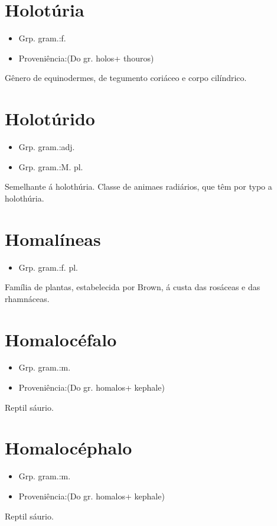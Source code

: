 \documentclass{article}
\begin{document}
\section{Holotúria}
\begin{itemize}
\item {Grp. gram.:f.}
\end{itemize}
\begin{itemize}
\item {Proveniência:(Do gr. \textunderscore holos\textunderscore  + \textunderscore thouros\textunderscore )}
\end{itemize}
Gênero de equinodermes, de tegumento coriáceo e corpo cilíndrico.
\section{Holotúrido}
\begin{itemize}
\item {Grp. gram.:adj.}
\end{itemize}
\begin{itemize}
\item {Grp. gram.:M. pl.}
\end{itemize}
Semelhante á holothúria.
Classe de animaes radiários, que têm por typo a holothúria.
\section{Homalíneas}
\begin{itemize}
\item {Grp. gram.:f. pl.}
\end{itemize}
Família de plantas, estabelecida por Brown, á custa das rosáceas e das rhamnáceas.
\section{Homalocéfalo}
\begin{itemize}
\item {Grp. gram.:m.}
\end{itemize}
\begin{itemize}
\item {Proveniência:(Do gr. \textunderscore homalos\textunderscore  + \textunderscore kephale\textunderscore )}
\end{itemize}
Reptil sáurio.
\section{Homalocéphalo}
\begin{itemize}
\item {Grp. gram.:m.}
\end{itemize}
\begin{itemize}
\item {Proveniência:(Do gr. \textunderscore homalos\textunderscore  + \textunderscore kephale\textunderscore )}
\end{itemize}
Reptil sáurio.
\end{document}
